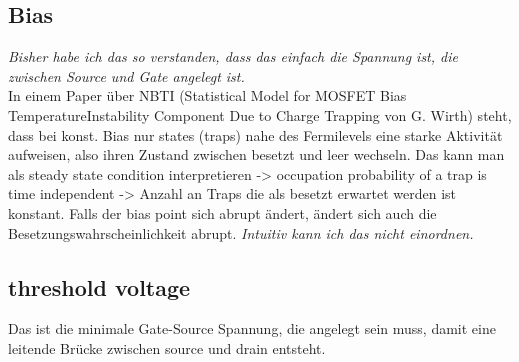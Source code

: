 \documentclass[paper=a4,10pt]{scrartcl}
\begin{document}
\subsection{Bias}
\textit{Bisher habe ich das so verstanden, dass das einfach die Spannung ist, die zwischen Source und Gate angelegt ist.} \\

\noindent
In einem Paper über NBTI (Statistical Model for MOSFET Bias TemperatureInstability Component Due to Charge Trapping von G. Wirth) steht, dass bei konst. Bias nur states (traps) nahe des Fermilevels eine starke Aktivität aufweisen, also ihren Zustand zwischen besetzt und leer wechseln. Das kann man als steady state condition interpretieren -> occupation probability of a trap is time independent -> Anzahl an Traps die als besetzt erwartet werden ist konstant. Falls der bias point sich abrupt ändert, ändert sich auch die Besetzungswahrscheinlichkeit abrupt.
\textit{Intuitiv kann ich das nicht einordnen.}

\subsection{threshold voltage}
Das ist die minimale Gate-Source Spannung, die angelegt sein muss, damit eine leitende Brücke zwischen source und drain entsteht.
\end{document}
